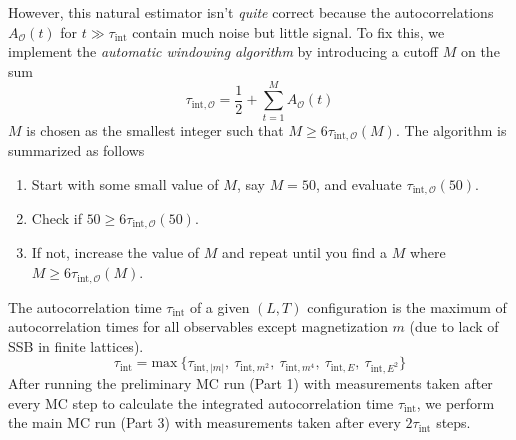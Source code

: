 \documentclass[../journal_main.tex]{subfiles}
\begin{document}
However, this natural estimator isn't \textit{quite} correct because the autocorrelations $A_\mathcal{O}(t)$ for $t \gg \tau_\text{int}$ contain much noise but little signal. To fix this, we implement the \textit{automatic windowing algorithm} \cite{Sokal1997} by introducing a cutoff $M$ on the sum
\begin{equation}
    \tau_{\text{int}, \mathcal{O}} = \frac{1}{2} + \sum_{t=1}^{M} A_\mathcal{O}(t)
\end{equation} 
$M$ is chosen as the smallest integer such that $M \geq 6 \tau_{\text{int}, \mathcal{O}}(M)$. The algorithm is summarized as follows  
\begin{enumerate}
    \setlength{\itemsep}{0.1em}
    \item Start with some small value of $M$, say $M=50$, and evaluate $\tau _{\text{int}, \mathcal{O}}(50)$.
    \item Check if $50 \geq 6\tau _{\text{int}, \mathcal{O}}(50)$.
    \item If not, increase the value of $M$ and repeat until you find a $M$ where $M \geq 6 \tau_{\text{int}, \mathcal{O}}(M)$.           
\end{enumerate}   
The autocorrelation time $\tau_\text{int}$ of a given $(L, T)$ configuration is the maximum of autocorrelation times for all observables except magnetization $m$ (due to lack of SSB in finite lattices). 
\begin{equation}
    \tau _\text{int} = \text{max}\:\{\tau_{\text{int},|m|},\: \tau_{\text{int}, m^2},\: \tau_{\text{int}, m^4},\: \tau_{\text{int}, E},\: \tau_{\text{int}, E^2}\}
\end{equation}
After running the preliminary MC run (Part 1) with measurements taken after every MC step to calculate the integrated autocorrelation time $\tau _\text{int}$, we perform the main MC run (Part 3) with measurements taken after every $2\tau _\text{int}$ steps.  
\end{document}
